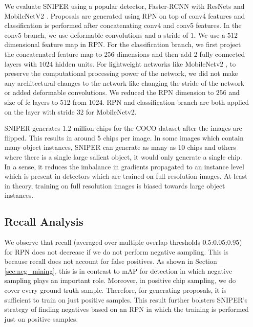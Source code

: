 \documentclass{article}
\begin{document}
We evaluate SNIPER using a popular detector, Faster-RCNN with ResNets \cite{he2016deep,he2016identity} and MobileNetV2 \cite{mobilenetv2}. Proposals are generated using RPN on top of conv4 features and classification is performed after concatenating conv4 and conv5 features. In the conv5 branch, we use deformable convolutions and a stride of $1$. We use a $512$ dimensional feature map in RPN. For the classification branch, we first project the concatenated feature map to $256$ dimensions and then add $2$ fully connected layers with $1024$ hidden units. For lightweight networks like MobileNetv2 \cite{mobilenetv2}, to preserve the computational processing power of the network, we did not make any architectural changes to the network like changing the stride of the network or added deformable convolutions. We reduced the RPN dimension to $256$ and size of fc layers to $512$ from $1024$. RPN and classification branch are both applied on the layer with stride $32$ for MobileNetv2. 

SNIPER generates $1.2$ million chips for the COCO dataset after the images are flipped. This results in around $5$ chips per image. In some images which contain many object instances, SNIPER can generate as many as $10$ chips and others where there is a single large salient object, it would only generate a single chip. In a sense, it reduces the imbalance in gradients propagated to an instance level which is present in detectors which are trained on full resolution images. At least in theory, training on full resolution images is biased towards large object instances.


\subsection{Recall Analysis}
We observe that recall (averaged over multiple overlap thresholds 0.5:0.05:0.95) for RPN does not decrease if we do not perform negative sampling. This is because recall does not account for false positives. As shown in Section \ref{sec:neg_mining}, this is in contrast to mAP for detection in which negative sampling plays an important role. Moreover, in positive chip sampling, we do cover every ground truth sample. Therefore, for generating proposals, it is sufficient to train on just positive samples. This result further bolsters SNIPER's strategy of finding negatives based on an RPN  in which the training is performed just on positive samples. 
\end{document}
